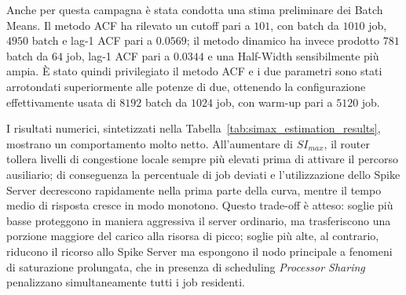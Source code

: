 ﻿\documentclass[a4paper,12pt]{article}
\begin{document}
Anche per questa campagna è stata condotta una stima preliminare dei Batch Means. Il metodo ACF ha rilevato un cutoff pari a $101$, con batch da $1010$ job, $4950$ batch e lag-1 ACF pari a $0.0569$; il metodo dinamico ha invece prodotto $781$ batch da $64$ job, lag-1 ACF pari a $0.0344$ e una Half-Width sensibilmente più ampia. È stato quindi privilegiato il metodo ACF e i due parametri sono stati arrotondati superiormente alle potenze di due, ottenendo la configurazione effettivamente usata di $8192$ batch da $1024$ job, con warm-up pari a $5120$ job.

I risultati numerici, sintetizzati nella Tabella~\ref{tab:simax_estimation_results}, mostrano un comportamento molto netto. All'aumentare di $SI_{max}$, il router tollera livelli di congestione locale sempre più elevati prima di attivare il percorso ausiliario; di conseguenza la percentuale di job deviati e l'utilizzazione dello Spike Server decrescono rapidamente nella prima parte della curva, mentre il tempo medio di risposta cresce in modo monotono. Questo trade-off è atteso: soglie più basse proteggono in maniera aggressiva il server ordinario, ma trasferiscono una porzione maggiore del carico alla risorsa di picco; soglie più alte, al contrario, riducono il ricorso allo Spike Server ma espongono il nodo principale a fenomeni di saturazione prolungata, che in presenza di scheduling \textit{Processor Sharing} penalizzano simultaneamente tutti i job residenti.
\end{document}
